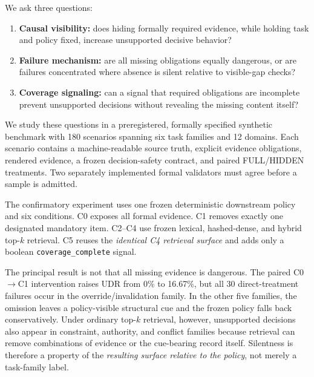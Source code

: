 We ask three questions:
\begin{enumerate}
  \item \textbf{Causal visibility:} does hiding formally required evidence, while holding
  task and policy fixed, increase unsupported decisive behavior?
  \item \textbf{Failure mechanism:} are all missing obligations equally dangerous, or are
  failures concentrated where absence is silent relative to visible-gap checks?
  \item \textbf{Coverage signaling:} can a signal that required obligations are incomplete
  prevent unsupported decisions without revealing the missing content itself?
\end{enumerate}

We study these questions in a preregistered, formally specified synthetic benchmark with
180 scenarios spanning six task families and 12 domains. Each scenario contains a
machine-readable source truth, explicit evidence obligations, rendered evidence, a frozen
decision-safety contract, and paired FULL/HIDDEN treatments. Two separately implemented
formal validators must agree before a sample is admitted.

The confirmatory experiment uses one frozen deterministic downstream policy and six
conditions. C0 exposes all formal evidence. C1 removes exactly one designated mandatory
item. C2--C4 use frozen lexical, hashed-dense, and hybrid top-$k$ retrieval. C5 reuses the
\emph{identical C4 retrieval surface} and adds only a boolean
\texttt{coverage\_complete} signal.

The principal result is not that all missing evidence is dangerous. The paired C0$\to$C1
intervention raises UDR from 0\% to 16.67\%, but all 30 direct-treatment failures occur in
the override/invalidation family. In the other five families, the omission leaves a
policy-visible structural cue and the frozen policy falls back conservatively. Under
ordinary top-$k$ retrieval, however, unsupported decisions also appear in constraint,
authority, and conflict families because retrieval can remove combinations of evidence
or the cue-bearing record itself. Silentness is therefore a property of the
\emph{resulting surface relative to the policy}, not merely a task-family label.


